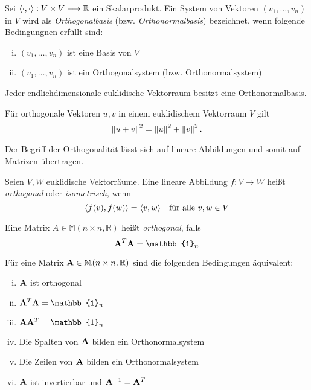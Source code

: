 \begin{defn}
Sei $\langle \cdot, \cdot \rangle: V \times V \longrightarrow \mathbb{R}$ ein Skalarprodukt. Ein System von Vektoren $(v_1, \ldots, v_n)$ in $V$ wird als \textit{Orthogonalbasis} (bzw. \textit{Orthonormalbasis}) bezeichnet, wenn folgende Bedingungnen erfüllt sind:
\begin{enumerate}[(i)]
\item $(v_1, \ldots, v_n)$ ist eine Basis von $V$
\item $(v_1, \ldots, v_n)$ ist ein Orthogonalsystem (bzw. Orthonormalsystem)
\end{enumerate}
\end{defn}

\begin{thm}
Jeder endlichdimensionale euklidische Vektorraum besitzt eine Orthonormalbasis.
\end{thm}

\begin{thm}
\label{pythagoras}
Für orthogonale Vektoren $u,v$ in einem euklidischem Vektorraum $V$ gilt
$$\left\lVert u+v \right\rVert^2 = \left\lVert u \right\rVert^2 + \left\lVert v \right\rVert^2.$$
\end{thm}

Der Begriff der Orthogonalität lässt sich auf lineare Abbildungen und somit auf Matrizen übertragen.

\begin{thm}
Seien $V,W$ euklidische Vektorräume. Eine lineare Abbildung $f: V \longrightarrow W$ heißt \textit{orthogonal} oder \textit{isometrisch}, wenn
$$\langle f(v), f(w) \rangle = \langle v, w \rangle \quad \text{für alle } v,w \in V$$
\end{thm}

\begin{defn}
Eine Matrix $A \in \mathbb{M}(n \times n, \mathbb{R})$ heißt 		\textit{orthogonal}, falls
$$\mat A^T \mat A = \mathbb{1}_n$$
\end{defn}

\begin{thm}[Bosch]
Für eine Matrix $\mathbf{A} \in \mathbb{M}(n \times n, \mathbb{R})$ sind die folgenden Bedingungen äquivalent:
\begin{enumerate}[(i)]
\item $\mathbf{A}$ ist orthogonal
\item $\mat A^T \mat A = \mathbb{1}_n$
\item $\mat A \mat A^T = \mathbb{1}_n$
\item Die Spalten von $\mathbf{A}$ bilden ein Orthonormalsystem
\item Die Zeilen von $\mathbf{A}$ bilden ein Orthonormalsystem
\item $\mathbf{A}$ ist invertierbar und $\mathbf{A}^{-1} = \mathbf{A}^T$
\end{enumerate}
\end{thm}

